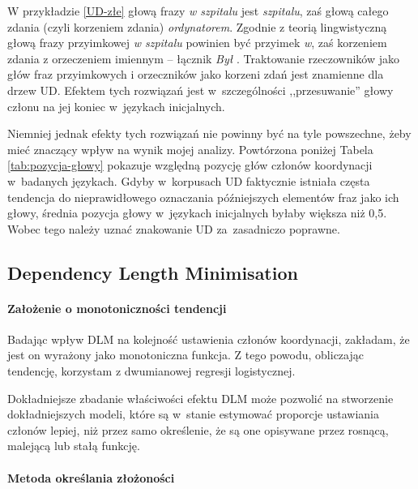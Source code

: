 W przykładzie \eqref{UD-złe} głową frazy \textit{w szpitalu} jest \textit{szpitalu}, zaś głową całego zdania (czyli korzeniem zdania) \textit{ordynatorem}. Zgodnie z teorią lingwistyczną głową frazy przyimkowej \textit{w szpitalu} powinien być przyimek \textit{w}, zaś korzeniem zdania z orzeczeniem imiennym -- łącznik \textit{Był} \citep{hoeksema1992head}. Traktowanie rzeczowników jako głów fraz przyimkowych i orzeczników jako korzeni zdań jest znamienne dla drzew UD. Efektem tych rozwiązań jest w~szczególności ,,przesuwanie'' głowy członu na jej koniec w~językach inicjalnych.

Niemniej jednak efekty tych rozwiązań nie powinny być na tyle powszechne, żeby mieć znaczący wpływ na wynik mojej analizy. Powtórzona poniżej Tabela \ref{tab:pozycja-głowy} pokazuje względną pozycję głów członów koordynacji w~badanych językach. Gdyby w~korpusach UD faktycznie istniała częsta tendencja do nieprawidłowego oznaczania późniejszych elementów fraz jako ich głowy, średnia pozycja głowy w~językach inicjalnych byłaby większa niż 0,5. Wobec tego należy uznać znakowanie UD za~zasadniczo poprawne.



\subsection{Dependency Length Minimisation}

\paragraph{Założenie o monotoniczności tendencji}

Badając wpływ DLM na kolejność ustawienia członów koordynacji, zakładam, że jest on wyrażony jako monotoniczna funkcja. Z tego powodu, obliczając tendencję, korzystam z dwumianowej regresji logistycznej.


Dokładniejsze zbadanie właściwości efektu DLM może pozwolić na stworzenie dokładniejszych modeli, które są w~stanie estymować proporcje ustawiania członów lepiej, niż przez samo określenie, że są one opisywane przez rosnącą, malejącą lub stałą funkcję. 

\paragraph{Metoda określania złożoności}

